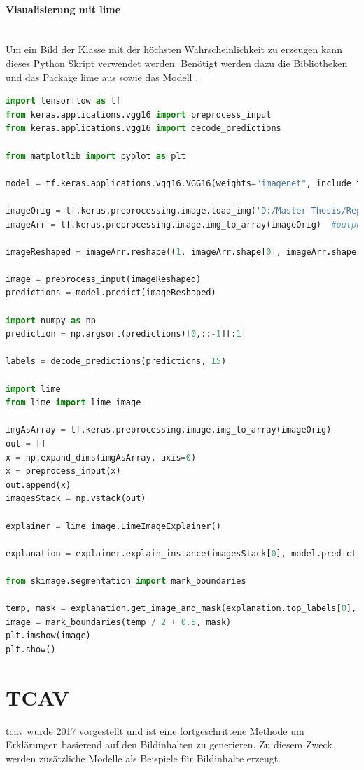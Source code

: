 \documentclass[
  12pt, %
  a4paper, %
  oneside, %
  openany, 
  numbers=noenddot, %
  BCOR=5mm, %
  parskip=half*, %
  thesis, %
]{bfhbook}
\newcommand{\parag}[1]{\paragraph*{#1}\mbox{}\\}
\begin{document}
\parag{Visualisierung mit lime}
\break
Um ein Bild der Klasse mit der höchsten Wahrscheinlichkeit zu erzeugen kann dieses Python Skript verwendet werden. Benötigt werden dazu die Bibliotheken \parencite{TensorFlow} und das Package lime aus \parencite{limeKeras} sowie das Modell \parencite{vgg16}.
\begin{lstlisting}[language=Python, caption=Lime Visualisierung für die wahrscheinlichste Klasse]
import tensorflow as tf
from keras.applications.vgg16 import preprocess_input
from keras.applications.vgg16 import decode_predictions

from matplotlib import pyplot as plt

model = tf.keras.applications.vgg16.VGG16(weights="imagenet", include_top=True)

imageOrig = tf.keras.preprocessing.image.load_img('D:/Master Thesis/Repo/Test Images/tabby.2.JPG', target_size=(224, 224))
imageArr = tf.keras.preprocessing.image.img_to_array(imageOrig)  #output Numpy-array

imageReshaped = imageArr.reshape((1, imageArr.shape[0], imageArr.shape[1], imageArr.shape[2]))

image = preprocess_input(imageReshaped)
predictions = model.predict(imageReshaped)

import numpy as np
prediction = np.argsort(predictions)[0,::-1][:1]

labels = decode_predictions(predictions, 15)
    
import lime 
from lime import lime_image

imgAsArray = tf.keras.preprocessing.image.img_to_array(imageOrig)
out = []
x = np.expand_dims(imgAsArray, axis=0)
x = preprocess_input(x)
out.append(x)
imagesStack = np.vstack(out)
            
explainer = lime_image.LimeImageExplainer()

explanation = explainer.explain_instance(imagesStack[0], model.predict, top_labels=1, hide_color=0, num_samples=1000)

from skimage.segmentation import mark_boundaries

temp, mask = explanation.get_image_and_mask(explanation.top_labels[0], positive_only=True, num_features=5, hide_rest=True)
image = mark_boundaries(temp / 2 + 0.5, mask)
plt.imshow(image)
plt.show()
\end{lstlisting}

\section{TCAV}
 \acrfull{tcav} wurde 2017 vorgestellt \parencite{Kim2017} und ist eine fortgeschrittene Methode um Erklärungen basierend auf den Bildinhalten zu generieren. Zu diesem Zweck werden zusätzliche Modelle als Beispiele für Bildinhalte erzeugt.
 
\end{document}
